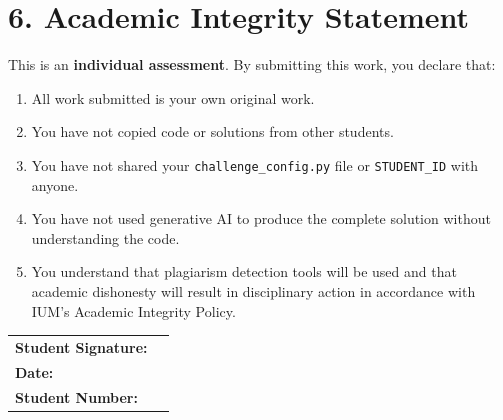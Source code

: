 \documentclass[12pt,a4paper]{article}
\begin{document}
\section*{6. Academic Integrity Statement}

This is an \textbf{individual assessment}. By submitting this work, you declare that:

\begin{enumerate}
  \item All work submitted is your own original work.
  \item You have not copied code or solutions from other students.
  \item You have not shared your \texttt{challenge\_config.py} file or \texttt{STUDENT\_ID} with anyone.
  \item You have not used generative AI to produce the complete solution without understanding the code.
  \item You understand that plagiarism detection tools will be used and that academic dishonesty will result in disciplinary action in accordance with IUM's Academic Integrity Policy.
\end{enumerate}

\vspace{1cm}

\noindent
\begin{tabularx}{\textwidth}{@{}p{5cm}X@{}}
\textbf{Student Signature:} & \hrulefill \\[8pt]
\textbf{Date:} & \hrulefill \\[8pt]
\textbf{Student Number:} & \hrulefill \\
\end{tabularx}

\vspace{1.5cm}
\end{document}
